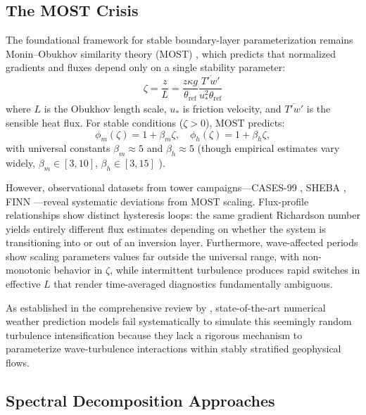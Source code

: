\subsection{The MOST Crisis}

The foundational framework for stable boundary-layer parameterization remains Monin--Obukhov similarity theory (MOST) \citep{Obukhov1946, Paulson1970}, which predicts that normalized gradients and fluxes depend only on a single stability parameter:
\begin{equation}
\zeta = \frac{z}{L} = \frac{z \kappa g}{\theta_{\mathrm{ref}}} \frac{\overline{T'w'}}{u_*^2 \theta_{\mathrm{ref}}}
\label{eq:zeta}
\end{equation}
where $L$ is the Obukhov length scale, $u_*$ is friction velocity, and $\overline{T'w'}$ is the sensible heat flux. For stable conditions ($\zeta > 0$), MOST predicts:
\begin{equation}
\phi_m(\zeta) = 1 + \beta_m\zeta, \quad \phi_h(\zeta) = 1 + \beta_h\zeta,
\end{equation}
with universal constants $\beta_m \approx 5$ and $\beta_h \approx 5$ (though empirical estimates vary widely, $\beta_m \in [3, 10]$, $\beta_h \in [3, 15]$ \citep{Dyer1974, Högström1988}).

However, observational datasets from tower campaigns---CASES-99 \citep{Poulos2002}, SHEBA \citep{Uttal2002}, FINN \citep{Mahrt2013}---reveal systematic deviations from MOST scaling. Flux-profile relationships show distinct hysteresis loops: the same gradient Richardson number yields entirely different flux estimates depending on whether the system is transitioning into or out of an inversion layer. Furthermore, wave-affected periods show scaling parameters values far outside the universal range, with non-monotonic behavior in $\zeta$, while intermittent turbulence produces rapid switches in effective $L$ that render time-averaged diagnostics fundamentally ambiguous.

As established in the comprehensive review by \citet{Sun2015}, state-of-the-art numerical weather prediction models fail systematically to simulate this seemingly random turbulence intensification because they lack a rigorous mechanism to parameterize wave-turbulence interactions within stably stratified geophysical flows.

\subsection{Spectral Decomposition Approaches}

